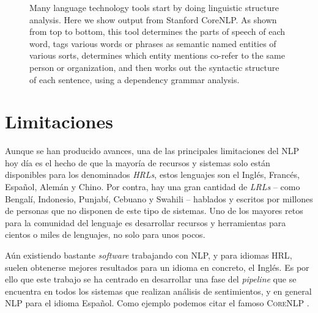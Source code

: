 \begin{figure}[bth]
  \caption[Ejemplo de parseo de dependencias]{Many language technology tools
start by doing linguistic structure analysis. Here we show output from Stanford
CoreNLP. As shown from top to bottom, this tool determines the parts of speech
of each word, tags various words or phrases as semantic named entities of
various sorts, determines which entity mentions co-refer to the same person or
organization, and then works out the syntactic structure of each sentence, using
a dependency grammar analysis.}
  \label{fig:corenlp}
\end{figure}

\section{Limitaciones}
\label{sec:nlplimits}

Aunque se han producido avances, una de las principales limitaciones del
\ac{NLP} hoy día es el hecho de que la mayoría de recursos y sistemas solo están
disponibles para los denominados \emph{\acp{HRL}}, estos lenguajes son el Inglés, Francés, Español, Alemán y
Chino. Por contra, hay una gran cantidad de \emph{\acp{LRL}}
-- como Bengalí, Indonesio,
Punjabí, Cebuano y Swahili -- hablados y escritos por millones de personas que
no disponen de este tipo de sistemas. Uno de los mayores retos para la comunidad
del lenguaje es desarrollar recursos y herramientas para cientos o miles de
lenguajes, no solo para unos pocos.

Aún existiendo bastante \emph{software} trabajando con \ac{NLP}, y para idiomas
\ac{HRL}, suelen obtenerse mejores resultados para un idioma en concreto, el
Inglés.  Es por ello que
este trabajo se ha centrado en desarrollar una fase del \emph{pipeline} que se
encuentra en todos los sistemas que realizan análisis de sentimientos, y en
general \ac{NLP} para el idioma Español. Como ejemplo podemos citar el famoso
\textsc{CoreNLP} \cite{manning-EtAl:2014:P14-5}.

